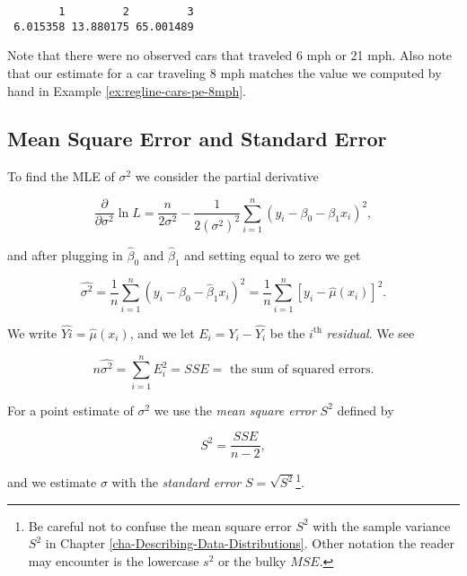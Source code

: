 \documentclass[]{book}
\let\rmarkdownfootnote\footnote%
\def\footnote{\protect\rmarkdownfootnote}
\numberwithin{equation}{chapter}
\numberwithin{figure}{chapter}
\theoremstyle{plain}
\theoremstyle{definition}
\theoremstyle{remark}
\theoremstyle{definition}
\theoremstyle{definition}
\theoremstyle{remark}
\begin{document}
\begin{verbatim}
        1         2         3 
 6.015358 13.880175 65.001489 
\end{verbatim}

Note that there were no observed cars that traveled 6 mph or 21 mph.
Also note that our estimate for a car traveling 8 mph matches the value
we computed by hand in Example \ref{ex:regline-cars-pe-8mph}.

\subsection{Mean Square Error and Standard
Error}\label{mean-square-error-and-standard-error}

To find the MLE of \(\sigma^{2}\) we consider the partial derivative

\begin{equation}
\frac{\partial}{\partial\sigma^{2}}\ln L=\frac{n}{2\sigma^{2}}-\frac{1}{2(\sigma^{2})^{2}}\sum_{i=1}^{n}(y_{i}-\beta_{0}-\beta_{1}x_{i})^{2},
\end{equation}

and after plugging in \(\hat{\beta}_{0}\) and \(\hat{\beta}_{1}\) and
setting equal to zero we get

\begin{equation}
\hat{\sigma^{2}}=\frac{1}{n}\sum_{i=1}^{n}(y_{i}-\hat{\beta}_{0}-\hat{\beta}_{1}x_{i})^{2}=\frac{1}{n}\sum_{i=1}^{n}[y_{i}-\hat{\mu}(x_{i})]^{2}.
\end{equation}

We write \(\hat{Yi}=\hat{\mu}(x_{i})\), and we let
\(E_{i}=Y_{i}-\hat{Y_{i}}\) be the \(i^{\mathrm{th}}\) \emph{residual}.
We see

\begin{equation}
n\hat{\sigma^{2}}=\sum_{i=1}^{n}E_{i}^{2}=SSE=\mbox{ the sum of squared errors.}
\end{equation}

For a point estimate of \(\sigma^{2}\) we use the \emph{mean square
error} \(S^{2}\) defined by

\begin{equation}
S^{2}=\frac{SSE}{n-2},
\end{equation}

and we estimate \(\sigma\) with the \emph{standard error}
\(S=\sqrt{S^{2}}\)\footnote{Be careful not to confuse the mean square
  error \(S^{2}\) with the sample variance \(S^{2}\) in Chapter
  \ref{cha-Describing-Data-Distributions}. Other notation the reader may
  encounter is the lowercase \(s^{2}\) or the bulky \(MSE\).}.
\end{document}
